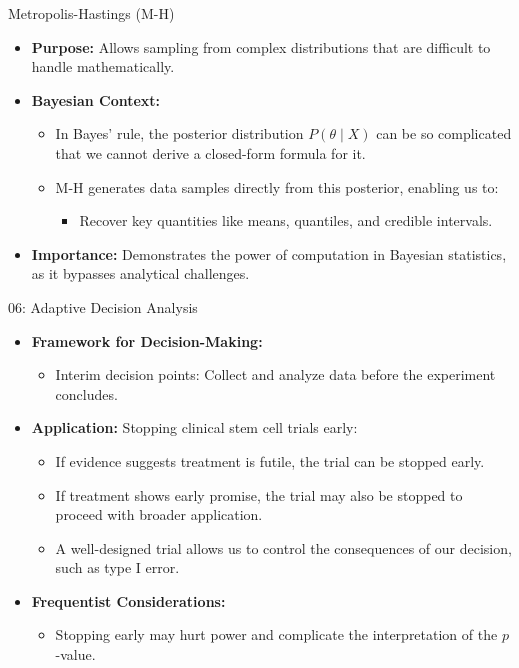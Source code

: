 \documentclass{beamer}
\begin{document}
\begin{frame}{Metropolis-Hastings (M-H)}
\begin{itemize}
    \item \textbf{Purpose:} Allows sampling from complex distributions that are difficult to handle mathematically.
    \item \textbf{Bayesian Context:}
    \begin{itemize}
        \item In Bayes' rule, the posterior distribution \( P(\theta \mid X) \) can be so complicated that we cannot derive a closed-form formula for it.
        \item M-H generates data samples directly from this posterior, enabling us to:
        \begin{itemize}
            \item Recover key quantities like means, quantiles, and credible intervals.
        \end{itemize}
    \end{itemize}
    \item \textbf{Importance:} Demonstrates the power of computation in Bayesian statistics, as it bypasses analytical challenges.
\end{itemize}
\end{frame}


\begin{frame}{06: Adaptive Decision Analysis}
\begin{itemize}
    \item \textbf{Framework for Decision-Making:}
    \begin{itemize}
        \item Interim decision points: Collect and analyze data before the experiment concludes.
    \end{itemize}
    \item \textbf{Application:} Stopping clinical stem cell trials early:
    \begin{itemize}
        \item If evidence suggests treatment is futile, the trial can be stopped early.
        \item If treatment shows early promise, the trial may also be stopped to proceed with broader application.
        \item A well-designed trial allows us to control the consequences of our decision, such as type I error.
    \end{itemize}
    \item \textbf{Frequentist Considerations:}
    \begin{itemize}
        \item Stopping early may hurt power and complicate the interpretation of the \( p \)-value.
    \end{itemize}
\end{itemize}
\end{frame}
\end{document}
